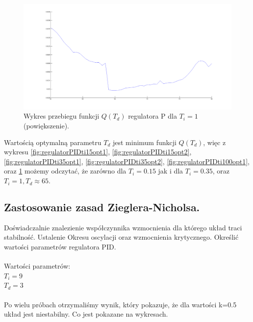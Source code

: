 \documentclass[a4paper,10pt]{article}
\begin{document}
\begin{figure}[!h]
    \centering
	\includegraphics[width=130mm]{CW2-regulatorPID-ti100-opt2.png}
	\caption{Wykres przebiegu funkcji $Q(T_{d})$ regulatora P dla $T_{i}=1$ (powiększenie).}
    \label{fig:regulatorPIDti100opt2}
\end{figure}
\newpage Wartością optymalną parametru $T_{d}$ jest minimum funkcji $Q(T_{d})$, więc z wykresu \ref{fig:regulatorPIDti15opt1}, \ref{fig:regulatorPIDti15opt2}, \ref{fig:regulatorPIDti35opt1}, \ref{fig:regulatorPIDti35opt2}, \ref{fig:regulatorPIDti100opt1}, oraz \ref{fig:regulatorPIDti100opt2} możemy odczytać, że zarówno dla $T_{i}=0.15$ jak i dla $T_{i}=0.35$, oraz $T_{i}=1, T_{d} \approx 65$.

\subsection{Zastosowanie zasad Zieglera-Nicholsa.}\label{sec:zad3}
Doświadczalnie znalezienie współczynnika wzmocnienia dla którego układ traci stabilność.
Ustalenie Okresu oscylacji oraz wzmocnienia krytycznego.
Określić wartości parametrów regulatora PID.\\
\\
Wartości parametrów:\\
$T_{i}=9$\\
$T_{d}=3$\\
\\
Po wielu próbach otrzymaliśmy wynik, który  pokazuje, że dla wartości k=0.5 układ jest niestabilny. Co jest pokazane na wykresach.\\
\end{document}
